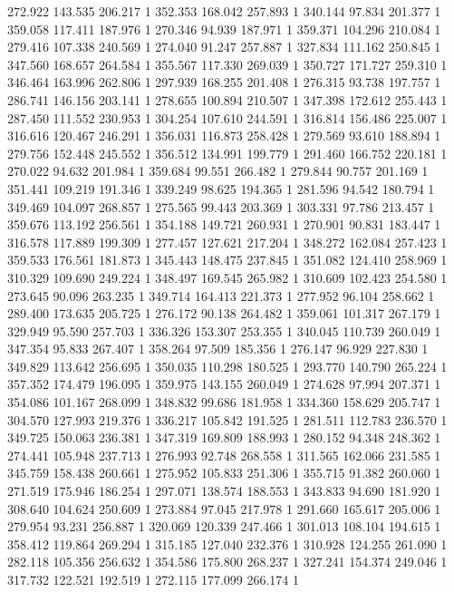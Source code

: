	272.922	143.535	206.217	1
	352.353	168.042	257.893	1
	340.144	97.834	201.377	1
	359.058	117.411	187.976	1
	270.346	94.939	187.971	1
	359.371	104.296	210.084	1
	279.416	107.338	240.569	1
	274.040	91.247	257.887	1
	327.834	111.162	250.845	1
	347.560	168.657	264.584	1
	355.567	117.330	269.039	1
	350.727	171.727	259.310	1
	346.464	163.996	262.806	1
	297.939	168.255	201.408	1
	276.315	93.738	197.757	1
	286.741	146.156	203.141	1
	278.655	100.894	210.507	1
	347.398	172.612	255.443	1
	287.450	111.552	230.953	1
	304.254	107.610	244.591	1
	316.814	156.486	225.007	1
	316.616	120.467	246.291	1
	356.031	116.873	258.428	1
	279.569	93.610	188.894	1
	279.756	152.448	245.552	1
	356.512	134.991	199.779	1
	291.460	166.752	220.181	1
	270.022	94.632	201.984	1
	359.684	99.551	266.482	1
	279.844	90.757	201.169	1
	351.441	109.219	191.346	1
	339.249	98.625	194.365	1
	281.596	94.542	180.794	1
	349.469	104.097	268.857	1
	275.565	99.443	203.369	1
	303.331	97.786	213.457	1
	359.676	113.192	256.561	1
	354.188	149.721	260.931	1
	270.901	90.831	183.447	1
	316.578	117.889	199.309	1
	277.457	127.621	217.204	1
	348.272	162.084	257.423	1
	359.533	176.561	181.873	1
	345.443	148.475	237.845	1
	351.082	124.410	258.969	1
	310.329	109.690	249.224	1
	348.497	169.545	265.982	1
	310.609	102.423	254.580	1
	273.645	90.096	263.235	1
	349.714	164.413	221.373	1
	277.952	96.104	258.662	1
	289.400	173.635	205.725	1
	276.172	90.138	264.482	1
	359.061	101.317	267.179	1
	329.949	95.590	257.703	1
	336.326	153.307	253.355	1
	340.045	110.739	260.049	1
	347.354	95.833	267.407	1
	358.264	97.509	185.356	1
	276.147	96.929	227.830	1
	349.829	113.642	256.695	1
	350.035	110.298	180.525	1
	293.770	140.790	265.224	1
	357.352	174.479	196.095	1
	359.975	143.155	260.049	1
	274.628	97.994	207.371	1
	354.086	101.167	268.099	1
	348.832	99.686	181.958	1
	334.360	158.629	205.747	1
	304.570	127.993	219.376	1
	336.217	105.842	191.525	1
	281.511	112.783	236.570	1
	349.725	150.063	236.381	1
	347.319	169.809	188.993	1
	280.152	94.348	248.362	1
	274.441	105.948	237.713	1
	276.993	92.748	268.558	1
	311.565	162.066	231.585	1
	345.759	158.438	260.661	1
	275.952	105.833	251.306	1
	355.715	91.382	260.060	1
	271.519	175.946	186.254	1
	297.071	138.574	188.553	1
	343.833	94.690	181.920	1
	308.640	104.624	250.609	1
	273.884	97.045	217.978	1
	291.660	165.617	205.006	1
	279.954	93.231	256.887	1
	320.069	120.339	247.466	1
	301.013	108.104	194.615	1
	358.412	119.864	269.294	1
	315.185	127.040	232.376	1
	310.928	124.255	261.090	1
	282.118	105.356	256.632	1
	354.586	175.800	268.237	1
	327.241	154.374	249.046	1
	317.732	122.521	192.519	1
	272.115	177.099	266.174	1
